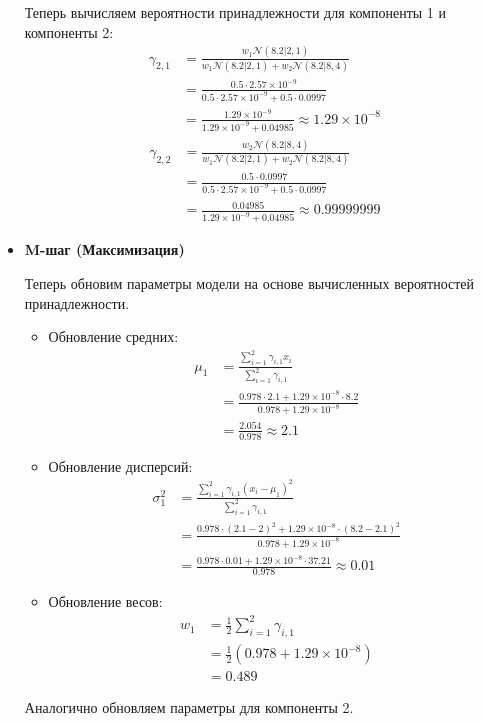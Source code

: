 \begin{itemize}
    Теперь вычисляем вероятности принадлежности для компоненты 1 и компоненты 2:
    \begin{align*}
    \gamma_{2,1} &= \frac{w_1 \mathcal{N}(8.2 | 2, 1)}{w_1 \mathcal{N}(8.2 | 2, 1) + w_2 \mathcal{N}(8.2 | 8, 4)} \\
    &= \frac{0.5 \cdot 2.57 \times 10^{-9}}{0.5 \cdot 2.57 \times 10^{-9} + 0.5 \cdot 0.0997} \\
    &= \frac{1.29 \times 10^{-9}}{1.29 \times 10^{-9} + 0.04985} \approx 1.29 \times 10^{-8}
    \end{align*}
    \begin{align*}
    \gamma_{2,2} &= \frac{w_2 \mathcal{N}(8.2 | 8, 4)}{w_1 \mathcal{N}(8.2 | 2, 1) + w_2 \mathcal{N}(8.2 | 8, 4)} \\
    &= \frac{0.5 \cdot 0.0997}{0.5 \cdot 2.57 \times 10^{-9} + 0.5 \cdot 0.0997} \\
    &= \frac{0.04985}{1.29 \times 10^{-9} + 0.04985} \approx 0.99999999
    \end{align*}

    \item \textbf{M-шаг (Максимизация)}

    Теперь обновим параметры модели на основе вычисленных вероятностей принадлежности.

    \begin{itemize}
        \item Обновление средних:
        \begin{align*}
        \mu_1 &= \frac{\sum_{i=1}^{2} \gamma_{i,1} x_i}{\sum_{i=1}^{2} \gamma_{i,1}} \\
        &= \frac{0.978 \cdot 2.1 + 1.29 \times 10^{-8} \cdot 8.2}{0.978 + 1.29 \times 10^{-8}} \\
        &= \frac{2.054}{0.978} \approx 2.1
        \end{align*}

        \item Обновление дисперсий:
        \begin{align*}
        \sigma_1^2 &= \frac{\sum_{i=1}^{2} \gamma_{i,1} (x_i - \mu_1)^2}{\sum_{i=1}^{2} \gamma_{i,1}} \\
        &= \frac{0.978 \cdot (2.1 - 2)^2 + 1.29 \times 10^{-8} \cdot (8.2 - 2.1)^2}{0.978 + 1.29 \times 10^{-8}} \\
        &= \frac{0.978 \cdot 0.01 + 1.29 \times 10^{-8} \cdot 37.21}{0.978} \approx 0.01
        \end{align*}

        \item Обновление весов:
        \begin{align*}
        w_1 &= \frac{1}{2} \sum_{i=1}^{2} \gamma_{i,1} \\
        &= \frac{1}{2} (0.978 + 1.29 \times 10^{-8}) \\
        &= 0.489
        \end{align*}
    \end{itemize}

    Аналогично обновляем параметры для компоненты 2.
\end{itemize}

